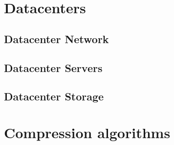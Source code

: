 \section{Datacenters}

\subsection{Datacenter Network}

\subsection{Datacenter Servers}

\subsection{Datacenter Storage}

\section{Compression algorithms}
